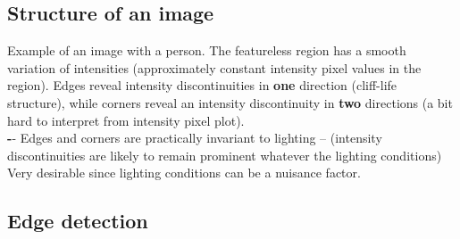 \documentclass[a4paper,11pt]{article}
\begin{document}
\subsection{Structure of an image}
Example of an image with a person. The featureless region has a smooth variation of intensities (approximately constant intensity pixel values in the region). Edges reveal intensity discontinuities in \textbf{one} direction (cliff-life structure), while corners reveal an intensity discontinuity in \textbf{two} directions (a bit hard to interpret from intensity pixel plot). \\
\textbf-- {Edges and corners are practically invariant to lighting --} (intensity discontinuities are likely to remain prominent whatever the lighting conditions) Very desirable since lighting conditions can be a nuisance factor.
\subsection{Edge detection}
\end{document}
